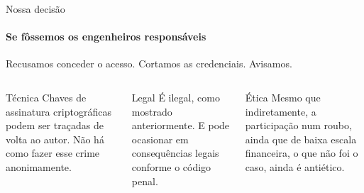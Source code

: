 \begin{frame}{Nossa decisão}
  \framesubtitle{Se fôssemos os engenheiros responsáveis}
  \begin{cefetblockplain}
    \small
    Recusamos conceder o acesso. Cortamos as credenciais. Avisamos.
  \end{cefetblockplain}
  \vspace{0.4em}
  \begin{columns}[t,onlytextwidth]
    \begin{cefetblock}{Técnica}
      \scriptsize
      Chaves de assinatura criptográficas podem ser traçadas de volta ao autor. Não há como fazer esse crime anonimamente.
    \end{cefetblock}
    \begin{cefetblock}{Legal}
      \scriptsize
      É ilegal, como mostrado anteriormente. E pode ocasionar em consequências legais conforme o código penal.
    \end{cefetblock}
    \begin{cefetblock}{Ética}
      \scriptsize
      Mesmo que indiretamente, a participação num roubo, ainda que de baixa escala financeira, o que não foi o caso, ainda é antiético.
    \end{cefetblock}
  \end{columns}
\end{frame}
